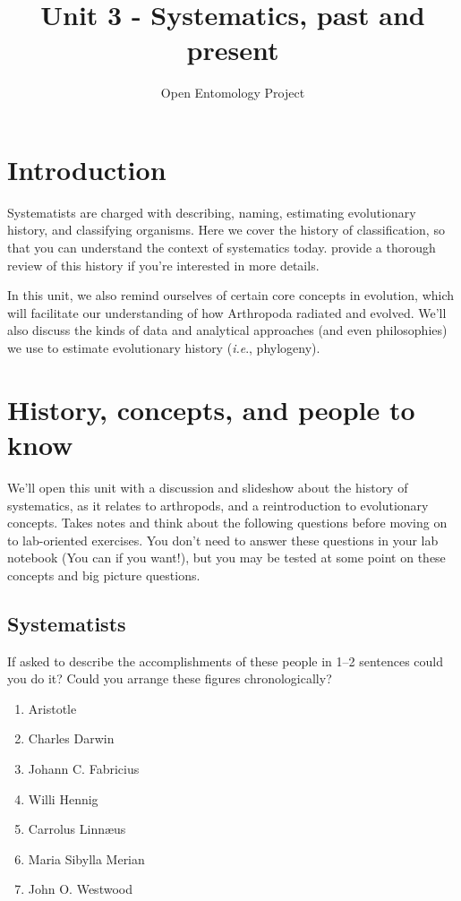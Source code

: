 \documentclass[letterpaper, 11pt]{article}
\title{Unit 3 - Systematics, past and present}
\author{Open Entomology Project}
\begin{document}
\cleanlookdateon %
\maketitle
\thispagestyle{fancy}
\section*{Introduction}
Systematists are charged with describing, naming, estimating evolutionary history, and classifying organisms. Here we cover the history of classification, so that you can understand the context of systematics today. \cite{EngelKristensen2013} provide a thorough review of this history if you're interested in more details.

In this unit, we also remind ourselves of certain core concepts in evolution, which will facilitate our understanding of how Arthropoda radiated and evolved. We'll also discuss the kinds of data and analytical approaches (and even philosophies) we use to estimate evolutionary history (\textit{i.e}., phylogeny).

\section{History, concepts, and people to know}
We'll open this unit with a discussion and slideshow about the history of systematics, as it relates to arthropods, and a reintroduction to evolutionary concepts. Takes notes and think about the following questions before moving on to lab-oriented exercises. You don't need to answer these questions in your lab notebook (You can if you want!), but you may be tested at some point on these concepts and big picture questions.
\subsection{Systematists}
If asked to describe the accomplishments of these people in 1--2 sentences could you do it? Could you arrange these figures chronologically?

\begin{enumerate} 
\item{Aristotle} 
\item{Charles Darwin}  
\item {Johann C. Fabricius}
\item {Willi Hennig}
\item{Carrolus Linn\ae{us}}  
\item{Maria Sibylla Merian}  
\item{John O. Westwood}  
\end{enumerate}
\end{document}
